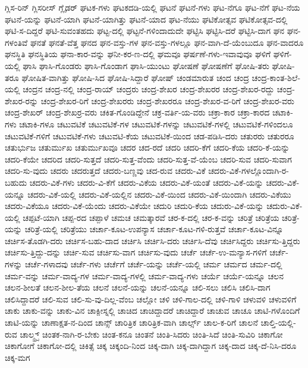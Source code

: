 {ಗ್ಲಿಸ-ರಿನ್
ಗ್ಲಿಸರೀಸ್
ಗ್ಲೈಡರ್
ಘಟಕ-ಗಳು
ಘಟಕದಡಿ-ಯಲ್ಲಿ
ಘಟನೆ
ಘಟನೆ-ಗಳು
ಘಟ-ನೆಗೂ
ಘಟ-ನೆಗೆ
ಘಟ-ನೆಯ
ಘಟನೆ-ಯನ್ನು
ಘಟನೆ-ಯಾಗಿ
ಘಟನೆ-ಯಾಗಿತ್ತು
ಘಟನೆ-ಯಾದ
ಘಟ-ನೆಯು
ಘಟಿಕೋತ್ಸವ
ಘಟಿಕೋತ್ಸವ-ದಲ್ಲಿ
ಘಟಿ-ಸ-ದಿದ್ದರೆ
ಘಟಿ-ಸುವಂತಹದು
ಘಟ್ಟ-ದಲ್ಲಿ
ಘಟ್ಟನೆ-ಗಳಿಂದಾದುದೇ
ಘಟ್ಟಿಸಿ
ಘಟ್ಟಿಸಿ-ದರೆ
ಘಟ್ಟಿಸಿ-ದಾಗ
ಘನ
ಘನ-ಗಳಂತಿವೆ
ಘನತೆ
ಘನತೆ-ವೆತ್ತ
ಘನದ
ಘನ-ವಸ್ತು-ಗಳ
ಘನ-ವಸ್ತು-ಗಳಲ್ಲೂ
ಘನ-ವಾಗಿ-ದೆ-ಯೆಂಬುದೂ
ಘನ-ವಾದರೂ
ಘನಸ್ಥಿತಿ
ಘನಸ್ಥಿತಿಯ
ಘನಾ-ಕಾರ-ವನ್ನು
ಘನೀ-ಕರ-ಣ-ದಲ್ಲಿ
ಘಮವೂ
ಘರ್ಷಣೆ-ಗಳು-ಇವಾವುವೂ
ಘಳಿಗೆ
ಘಳಿಗೆ-ಯಲ್ಲಿ
ಘಾಸಿ
ಘಾಸಿ-ಗೊಂಡರು
ಘಾಸಿ-ಗೊಂಡಾಗ
ಘಾಸಿ-ಯುಂಟು
ಘೋಷಣೆ
ಘೋಷಣೆಗೆ
ಘೋಷಿ-ತರು
ಘೋಷಿ-ತರೂ
ಘೋಷಿತ-ವಾಗಿತ್ತು
ಘೋಷಿ-ಸಿದ
ಘೋಷಿ-ಸಿದ್ದಾರೆ
ಘೋಷ್
ಚಂಡಮಾರುತ
ಚಂದ
ಚಂದ್ರ
ಚಂದ್ರ-ಕಾಂತ-ಶಿಲೆ-ಯಲ್ಲಿ
ಚಂದ್ರನ
ಚಂದ್ರ-ನಲ್ಲಿ
ಚಂದ್ರ-ರಾಯ್
ಚಂದ್ರರು
ಚಂದ್ರ-ಶೇಖರ
ಚಂದ್ರ-ಶೇಖರರ
ಚಂದ್ರ-ಶೇಖರ-ರದ್ದು
ಚಂದ್ರ-ಶೇಖರ-ರನ್ನು
ಚಂದ್ರ-ಶೇಖರ-ರಿಗೆ
ಚಂದ್ರ-ಶೇಖರರು
ಚಂದ್ರ-ಶೇಖರರೂ
ಚಂದ್ರ-ಶೇಖರ-ವ-ರಿಗೆ
ಚಂದ್ರ-ಶೇಖರ-ವರು
ಚಂದ್ರ-ಶೇಖರ್
ಚಂದ್ರ-ಶೇಖರ್ರ-ವರು
ಚಕಿತ-ಗೊಂಡಿದ್ದೇನೆ
ಚಕ್ರ-ವರ್ತಿ-ಯ-ವರು
ಚಕ್ರಾ-ಕಾರ
ಚಕ್ರಾ-ಕಾರದ
ಚಟಾಕಿ-ಗಳು
ಚಟಾಕಿ-ಗಳೂ
ಚಟುವಟಿಕೆ
ಚಟುವಟಿಕೆ-ಗಳ
ಚಟುವಟಿಕೆ-ಗಳನ್ನು
ಚಟುವಟಿಕೆ-ಗಳಲ್ಲಿ
ಚಟುವಟಿಕೆ-ಗಳಿಂದಲೂ
ಚಟುವಟಿಕೆ-ಗಳಿಗೆ
ಚಟುವಟಿಕೆ-ಗಳು
ಚಟುವಟಿ-ಕೆಯ
ಚಟುವಟಿಕೆ-ಯಿಂದ
ಚಡ-ಪಡಿಸಿ-ದರು
ಚತುರರು
ಚತುರರೂ
ಚತುರ್ಭುಜ
ಚತುರ್ಮುಖ
ಚತುರ್ಮುಖವೂ
ಚದರ
ಚದ-ರದೆ
ಚದರಿ
ಚದರಿ-ಕೆಗೆ
ಚದರಿ-ಕೆಯ
ಚದರಿ-ಕೆ-ಯನ್ನು
ಚದರಿ-ಕೆಯೇ
ಚದರಿದ
ಚದರಿ-ಸುತ್ತದೆ
ಚದರಿ-ಸುತ್ತ-ವೆಂದು
ಚದರಿ-ಸುತ್ತ-ವೆ-ಯೆಂಬ
ಚದರಿ-ಸುವ
ಚದರಿ-ಸುವಾಗ
ಚದರಿ-ಸು-ವುದು
ಚದರು
ಚದರುತ್ತದೆ
ಚದರು-ಬಣ್ಣವು
ಚದ-ರುವ
ಚದರು-ವಿಕೆ
ಚದರು-ವಿಕೆ-ಗಳಲ್ಲೊಂದಾಗಿ-ರ-ಬಹುದು
ಚದರು-ವಿಕೆ-ಗಳು
ಚದರು-ವಿ-ಕೆಗೆ
ಚದರು-ವಿಕೆಯ
ಚದರು-ವಿಕೆ-ಯಂತೆ
ಚದರು-ವಿಕೆ-ಯನ್ನು
ಚದರು-ವಿಕೆ-ಯನ್ನೂ
ಚದರು-ವಿಕೆ-ಯಲ್ಲಿ
ಚದರು-ವಿಕೆ-ಯಲ್ಲಿನ
ಚದರು-ವಿಕೆ-ಯಿಂದ
ಚದರು-ವಿಕೆ-ಯಿಂದಾಗಿ
ಚದರು-ವಿಕೆಯು
ಚದರು-ವಿಕೆಯೂ
ಚದರು-ವಿಕೆ-ಯೆಂದು
ಚದರು-ವಿಕೆಯೇ
ಚದುರಿ
ಚದುರಿ-ಕೆಯ
ಚದುರು-ವಿಕೆ-ಯನ್ನು
ಚದುರು-ವಿಕೆ-ಯಲ್ಲಿ
ಚಪ್ಪಟೆ-ಯಾಗಿ
ಚಪ್ಪ-ರದ
ಚಪ್ಪಾಳೆ
ಚಮಚ
ಚಮತ್ಕಾರವೆ
ಚರ-ಕ-ದಲ್ಲಿ
ಚರ-ಕ-ವನ್ನು
ಚರಿತ್ರೆ
ಚರಿತ್ರೆಯ
ಚರಿತ್ರೆ-ಯನ್ನು
ಚರಿತ್ರೆ-ಯಲ್ಲಿ
ಚರಿತ್ರೆಯು
ಚರ್ಚಾ-ಕೂಟ-ಉಪನ್ಯಾಸ
ಚರ್ಚಾ-ಕೂಟ-ಗಳಿ-ರುತ್ತವೆ
ಚರ್ಚಾ-ಕೂಟ-ವಿನ್ನೂ
ಚರ್ಚಿಸ-ತೊಡಗಿ-ದರು
ಚರ್ಚಿಸ-ಬಹು-ದಾದ
ಚರ್ಚಿಸಿ
ಚರ್ಚಿಸಿ-ದರು
ಚರ್ಚಿಸಿ-ದೆವು
ಚರ್ಚಿಸಿದ್ದರು
ಚರ್ಚಿಸು-ತ್ತಿದ್ದರು
ಚರ್ಚಿಸು-ತ್ತಿದ್ದು-ದನ್ನು
ಚರ್ಚಿ-ಸುವ
ಚರ್ಚಿಸು-ವಾಗ
ಚರ್ಚಿಸು-ವುದು
ಚರ್ಚೆ
ಚರ್ಚೆ-ಉ-ಮನ್ಯಾಸ-ಗಳಿಗೆ
ಚರ್ಚೆ-ಗಳನ್ನು
ಚರ್ಚೆ-ಗಳಾದವು
ಚರ್ಚೆ-ಗಳು
ಚರ್ಚೆಗೆ
ಚರ್ಚೆ-ಯನ್ನು
ಚರ್ಚೆ-ಯಲ್ಲಿ
ಚರ್ಮ
ಚರ್ಮದ
ಚರ್ಮ-ದಲ್ಲಿ
ಚರ್ಮ-ವನ್ನು
ಚರ್ಮ-ವಾದ್ಯ-ಗಳ
ಚರ್ಮ-ವಾದ್ಯ-ಗಳಲ್ಲಿ
ಚರ್ಮ-ವಾದ್ಯ-ಗಳು
ಚರ್ಯೆ
ಚರ್ಯೆ-ಯನ್ನೂ
ಚಲನ
ಚಲನ-ಶೀಲತೆ
ಚಲನ-ಶೀಲ-ತೆಯ
ಚಲನೆ
ಚಲನೆ-ಯನ್ನು
ಚಲನೆ-ಯನ್ನೂ
ಚಲಿ-ಸಲು
ಚಲಿಸಿ
ಚಲಿಸಿ-ದಾಗ
ಚಲಿಸಿದ್ದಾದರೆ
ಚಲಿ-ಸುವ
ಚಲಿ-ಸು-ವು-ದಿಲ್ಲ-ವೆಂಬ
ಚಲ್ಲೋ
ಚಳಿ
ಚಳಿ-ಗಾಲ-ದಲ್ಲಿ
ಚಳಿ-ಗಾಳಿ
ಚಳುವಳಿ
ಚಳುವಳಿಗೆ
ಚಾಕು
ಚಾಕು-ವನ್ನು
ಚಾಕು-ವಿನ
ಚಾಕ್ಪೀಸ್ನಲ್ಲಿ
ಚಾಚಿದ
ಚಾಚಿದ್ದಾದರೆ
ಚಾಚಿದ್ದಾರೆ
ಚಾಚುವ
ಚಾಚೂ
ಚಾಟಿ-ಗಳೊಂದಿಗೆ
ಚಾಟಿ-ಯನ್ನು
ಚಾಣಾಕ್ಷತ-ನ-ದಿಂದ
ಚಾನ್ಸ್
ಚಾರಿತ್ರಿಕ
ಚಾರಿತ್ರಿಕ-ವಾಗಿ
ಚಾರ್ಲ್ಸ್
ಚಾಲ-ಕ-ರಿಗೆ
ಚಾಲನೆ
ಚಾಲ್ತಿ-ಯಲ್ಲಿ-ರುವ
ಚಾಲ್ಮ್ರ್ಸ್
ಚಿಂತಕ-ನಾಗಿ-ರ-ಬೇಕು
ಚಿಂತ-ಕನೂ
ಚಿಂತನೆ
ಚಿಂತಿ-ಸಿದರು
ಚಿಂತಿ-ಸಿದೆ
ಚಿಂತಿ-ಸುವಿರಿ
ಚಿಕಾಗೋ
ಚಿಕಾಗೋಗೆ
ಚಿಕಾಗೋ-ದಲ್ಲಿ
ಚಿಕಿತ್ಸೆ
ಚಿಕ್ಕ
ಚಿಕ್ಕಂದಿ-ನಿಂದ
ಚಿಕ್ಕ-ದಾಗಿ
ಚಿಕ್ಕ-ದಾಗಿದ್ದಾಗ
ಚಿಕ್ಕ-ದಾದ
ಚಿಕ್ಕ-ದೆ-ನಿಸಿ-ದರೂ
ಚಿಕ್ಕ-ಮಗ
}
